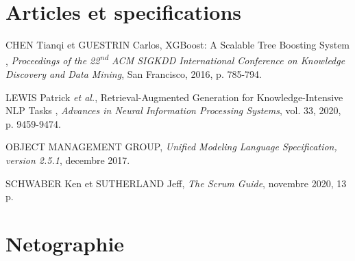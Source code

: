 \section*{Articles et specifications}

\begin{enumerate}[label={[\arabic*]},leftmargin=*,itemsep=4pt,start=6]

\item CHEN Tianqi et GUESTRIN Carlos, \guillemotleft{} XGBoost: A Scalable
  Tree Boosting System \guillemotright{}, \textit{Proceedings of the
  22\textsuperscript{nd} ACM SIGKDD International Conference on Knowledge
  Discovery and Data Mining}, San Francisco, 2016, p. 785-794.

\item LEWIS Patrick \textit{et al.}, \guillemotleft{} Retrieval-Augmented
  Generation for Knowledge-Intensive NLP Tasks \guillemotright{},
  \textit{Advances in Neural Information Processing Systems}, vol. 33,
  2020, p. 9459-9474.

\item OBJECT MANAGEMENT GROUP, \textit{Unified Modeling Language
  Specification, version 2.5.1}, decembre 2017.

\item SCHWABER Ken et SUTHERLAND Jeff, \textit{The Scrum Guide}, novembre
  2020, 13 p.

\end{enumerate}

\section*{Netographie}


